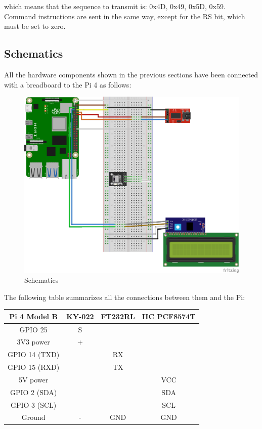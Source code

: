 \documentclass[a4paper, 12pt]{article}
\begin{document}
which means that the sequence to transmit is: 0x4D, 0x49, 0x5D, 0x59. \\
Command instructions are sent in the same way, except for the RS bit, which must be set to zero.

\subsection{Schematics}
All the hardware components shown in the previous sections have been connected with a breadboard to the Pi 4 as follows:
\begin{figure}[h]
    \includegraphics[width=14.3cm]{schematics}
    \centering
    \caption{Schematics}
\end{figure}

The following table summarizes all the connections between them and the Pi:
\begin{table}[h]
    \centering
    \begin{tabular}{c c c c} 
        \hline
        Pi 4 Model B & KY-022 & FT232RL & IIC PCF8574T \\ [0.5ex] 
        \hline\hline
        GPIO 25 & S & & \\
        3V3 power & +  & & \\
        GPIO 14 (TXD) & & RX  & \\
        GPIO 15 (RXD) & & TX  & \\
        5V power & & & VCC \\
        GPIO 2 (SDA) & & & SDA \\
        GPIO 3 (SCL) & & & SCL \\
        Ground & - & GND & GND \\
        \hline
        \end{tabular}
\end{table}
\end{document}
